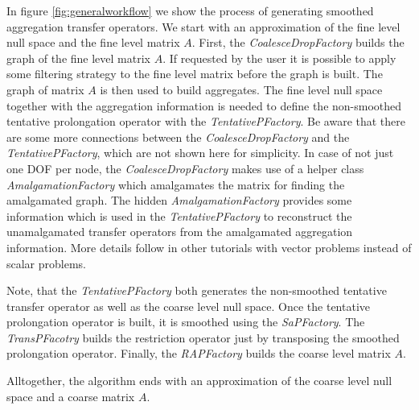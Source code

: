 In figure \ref{fig:generalworkflow} we show the process of generating smoothed aggregation transfer operators. We start with an approximation of the fine level null space and the fine level matrix $A$. 
First, the \textit{CoalesceDropFactory} builds the graph of the fine level matrix $A$. If requested by the user it is possible to apply some filtering strategy to the fine level matrix before the graph is built. The graph of matrix $A$ is then used to build aggregates. The fine level null space together with the aggregation information is needed to define the non-smoothed tentative prolongation operator with the \textit{TentativePFactory}. Be aware that there are some more connections between the \textit{CoalesceDropFactory} and the \textit{TentativePFactory}, which are not shown here for simplicity. In case of not just one DOF per node, the \textit{CoalesceDropFactory} makes use of a helper class \textit{AmalgamationFactory} which amalgamates the matrix for finding the amalgamated graph. The hidden \textit{AmalgamationFactory} provides some information which is used in the \textit{TentativePFactory} to reconstruct the unamalgamated transfer operators from the amalgamated aggregation information. More details follow in other tutorials with vector problems instead of scalar problems.

Note, that the \textit{TentativePFactory} both generates the non-smoothed tentative transfer operator as well as the coarse level null space. Once the tentative prolongation operator is built, it is smoothed using the \textit{SaPFactory}. The \textit{TransPFacotry} builds the restriction operator just by transposing the smoothed prolongation operator. Finally, the \textit{RAPFactory} builds the coarse level matrix $A$.

Alltogether, the algorithm ends with an approximation of the coarse level null space and a coarse matrix $A$.
